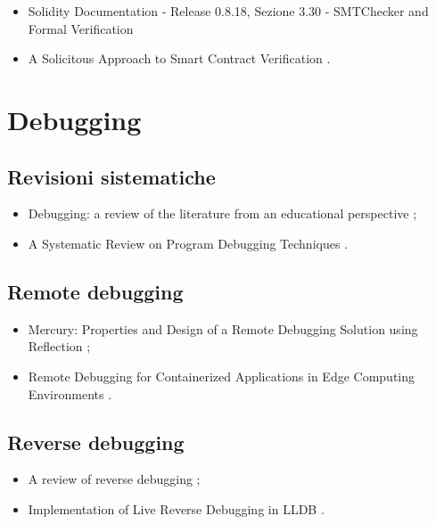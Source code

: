 \begin{itemize}

\item Solidity Documentation - Release 0.8.18, Sezione 3.30 - SMTChecker and Formal Verification \cite{solidity0.8.18smtcheckerdoc}

\item A Solicitous Approach to Smart Contract Verification \cite{otoni2023verification}.

\end{itemize}

\clearpage
{}
\section*{Debugging}

\subsection*{Revisioni sistematiche}
\begin{itemize}

\item Debugging: a review of the literature from an educational perspective \cite{mccauley2008debugreview};

\item A Systematic Review on Program Debugging Techniques \cite{ghosh2019debugreview}.

\end{itemize}

\subsection*{Remote debugging}
\begin{itemize}

\item Mercury: Properties and Design of a Remote Debugging Solution using Reflection \cite{papoulias2015remotedebug};

\item Remote Debugging for Containerized Applications in Edge Computing Environments \cite{ozcan2019remotedebug}.

\end{itemize}

\subsection*{Reverse debugging}
\begin{itemize}

\item A review of reverse debugging \cite{engblom2012reversedebug};

\item Implementation of Live Reverse Debugging in LLDB \cite{savidis2021reversedebug}.

\end{itemize}

